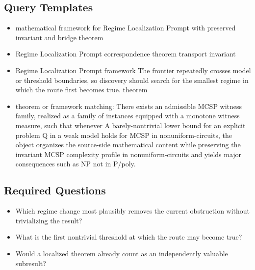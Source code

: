 \documentclass[11pt]{article}
\begin{document}
\subsection*{Query Templates}
\begin{itemize}[leftmargin=*,itemsep=0.2em]
\item mathematical framework for Regime Localization Prompt with preserved invariant and bridge theorem
\item Regime Localization Prompt correspondence theorem transport invariant
\item Regime Localization Prompt framework The frontier repeatedly crosses model or threshold boundaries, so discovery should search for the smallest regime in which the route first becomes true. theorem
\item theorem or framework matching: There exists an admissible MCSP witness family, realized as a family of instances equipped with a monotone witness measure, such that whenever A barely-nontrivial lower bound for an explicit problem Q in a weak model holds for MCSP in nonuniform-circuits, the object organizes the source-side mathematical content while preserving the invariant MCSP complexity profile in nonuniform-circuits and yields major consequences such as NP not in P/poly.
\end{itemize}
\subsection*{Required Questions}
\begin{itemize}[leftmargin=*,itemsep=0.2em]
\item Which regime change most plausibly removes the current obstruction without trivializing the result?
\item What is the first nontrivial threshold at which the route may become true?
\item Would a localized theorem already count as an independently valuable subresult?
\end{itemize}
\end{document}
